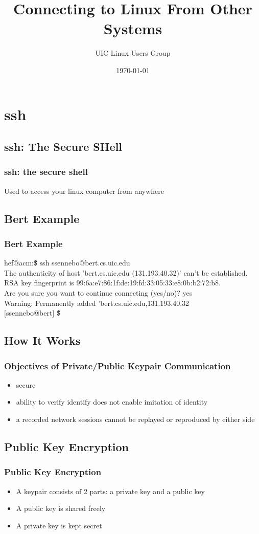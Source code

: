 \documentclass[hyperref={pdfpagelabels=false}]{beamer}
\title{Connecting to Linux From Other Systems}
\author{UIC Linux Users Group}
\date{\today}
\begin{document}
\frame{\titlepage}
\section[outline]{}
\frame[allowframebreaks]{\tableofcontents}
\section{ssh}
\subsection{ssh: The Secure SHell}
\frame
{
  \frametitle{ssh: the secure shell}
  Used to access your linux computer from anywhere
}
\subsection{Bert Example}
\frame
{
  \frametitle{Bert Example}
  hef@acm:\~\$ ssh ssennebo@bert.cs.uic.edu\\
  The authenticity of host 'bert.cs.uic.edu (131.193.40.32)' can't be established.\\
  RSA key fingerprint is 99:6a:e7:86:1f:de:19:fd:33:05:33:e8:0b:b2:72:b8.\\
  Are you sure you want to continue connecting (yes/no)? yes\\
  Warning: Permanently added 'bert.cs.uic.edu,131.193.40.32\\
  $[$ssennebo@bert$]$ \~\$
}
\subsection{How It Works}
\frame
{
  \frametitle{Objectives of Private/Public Keypair Communication}
  \begin{itemize}
  \item{secure}
  \item{ability to verify identify does not enable imitation of identity}
  \item{a recorded network sessions cannot be replayed or reproduced by either side}
  \end{itemize}
}
\subsection{Public Key Encryption}
\frame
{
    \frametitle{Public Key Encryption}
    \begin{itemize}
    \item{A keypair consists of 2 parts: a private key and a public key}
    \item{A public key is shared freely}
    \item{A private key is kept secret}
    \end{itemize}
}
\end{document}
